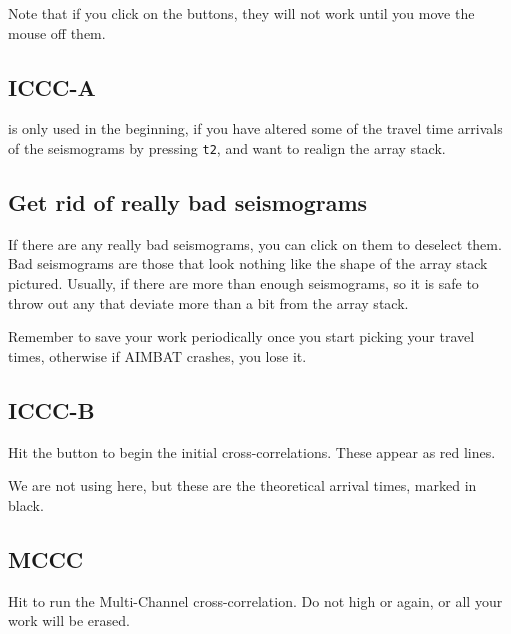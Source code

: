 \documentclass[letterpaper,10pt]{article}
\begin{document}
Note that if you click on the buttons, they will not work until you move the mouse off them.


\subsection{ICCC-A}

 is only used in the beginning, if you have altered some of the travel time arrivals of the seismograms by pressing \texttt{t2}, and want to realign the array stack. 


\subsection{Get rid of really bad seismograms}

If there are any really bad seismograms, you can click on them to deselect them. Bad seismograms are those that look nothing like the shape of the array stack pictured. Usually, if there are more than enough seismograms, so it is safe to throw out any that deviate more than a bit from the array stack. 

Remember to save your work periodically once you start picking your travel times, otherwise if AIMBAT crashes, you lose it. 


\subsection{ICCC-B}

Hit the  button to begin the initial cross-correlations. These appear as red lines. 

We are not using  here, but these are the theoretical arrival times, marked in black. 



\subsection{MCCC}

Hit  to run the Multi-Channel cross-correlation. Do not high  or  again, or all your work will be erased. 
\end{document}
